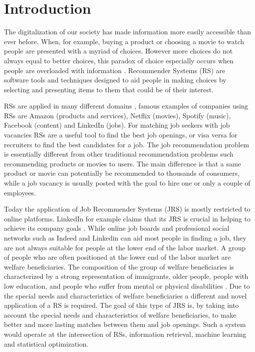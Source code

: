 \section{Introduction}
\label{sec:intro}




The digitalization of our society has made information more easily accessible than ever before.
When, for example, buying a product or choosing a movie to watch people are presented with a myriad of choices. 
However more choices do not always equal to better choices, this paradox of choice especially occurs when people are overloaded with information \cite{schwartz2004paradox}. 
Recommender Systems (RS) are software tools and techniques designed to aid people in making choices by selecting and presenting items to them that could be of their interest.

RSs are applied in many different domains \cite{aggarwal2016recommender}, famous examples of companies using RSs are Amazon (products and services), Netflix (movies), Spotify (music), Facebook (content) and LinkedIn (jobs).
For matching job seekers with job vacancies RSs are a useful tool to find the best job openings, or visa versa for recruiters to find the best candidates for a job.
The job recommendation problem is essentially different from other traditional recommendation problems such recommending products or movies to users.
The main difference is that a same product or movie can potentially be recommended to thousands of consumers, while a job vacancy is usually posted with the goal to hire one or only a couple of employees.

Today the application of Job Recommender Systems (JRS) is mostly restricted to online platforms. 
LinkedIn for example claims that its JRS is crucial in helping to achieve its company goals \cite{kenthapadi2017personalized}.
While online job boards and professional social networks such as Indeed and Linkedin can aid most people in finding a job, they are not always suitable for people at the lower end of the labor market.
A group of people who are often positioned at the lower end of the labor market are welfare beneficiaries. 
The composition of the group of welfare beneficiaries is characterized by a strong representation of immigrants, older people, people with low education, and people who suffer from mental or physical disabilities \cite{dodeweerd}.
Due to the special needs and characteristics of welfare beneficiaries a different and novel application of a RS is required. 
The goal of this type of JRS is, by taking into account the special needs and characteristics of welfare beneficiaries, to make better and more lasting matches between them and job openings.
Such a system would operate at the intersection of RSs, information retrieval, machine learning and statistical optimization. 

